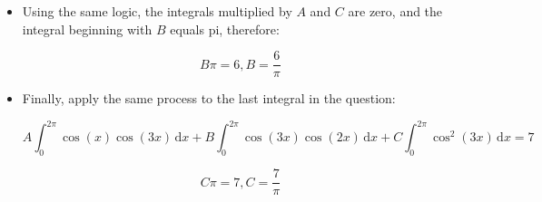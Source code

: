 \documentclass[11pt]{article}
\begin{document}
\begin{enumerate}
\begin{itemize}
\item Using the same logic, the integrals multiplied by $A$ and $C$ are zero, and the integral beginning with $B$ equals pi, therefore:

\begin{equation*}
B\pi = 6, B = \frac{6}{\pi}
\end{equation*}

\item Finally, apply the same process to the last integral in the question:

\begin{equation*}
A \int_0^{2\pi} \! \cos(x)\cos(3x) \, \mathrm{d} x + 
B \int_0^{2\pi} \! \cos(3x)\cos(2x) \, \mathrm{d} x + 
C \int_0^{2\pi} \! \cos^2(3x) \, \mathrm{d} x = 7
\end{equation*}

\begin{equation*}
C\pi = 7, C = \frac{7}{\pi}
\end{equation*}


\end{itemize}

\end{enumerate}
\end{document}
